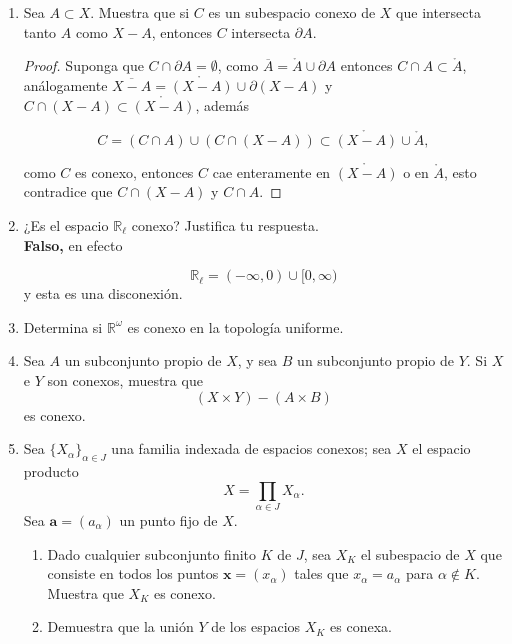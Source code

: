 \documentclass[11pt]{article}
\begin{document}
\begin{enumerate}
    \item Sea $A \subset X$. Muestra que si $C$ es un subespacio conexo de $X$ que intersecta tanto $A$ como $X - A$, entonces $C$ intersecta $\partial A$.

    \begin{proof}
        Suponga que $C\cap \partial A=\emptyset$, como $\overline{A}=\mathring{A}\cup \partial A$ entonces $C\cap A\subset \mathring{A}$, análogamente $\overline{X-A}=\mathring{(X-A)}\cup \partial (X-A)$  y $C\cap (X-A)\subset \mathring{(X-A)}$, además

        $$C=(C\cap A) \cup (C\cap (X-A))\subset \mathring{(X-A)}\cup \mathring{A},$$

        como $C$ es conexo, entonces $C$ cae enteramente en $\mathring{(X-A)}$ o en $\mathring{A}$, esto contradice que $C\cap (X-A)$ y $C\cap A$.
    \end{proof}
    
    \item ¿Es el espacio $\mathbb{R}_\ell$ conexo? Justifica tu respuesta.\\
    
    \textbf{Falso,} en efecto 

    $$\mathbb{R}_{\ell}=(-\infty,0)\cup [0,\infty)$$
     y esta es una disconexión.

    \item Determina si $\mathbb{R}^\omega$ es conexo en la topología uniforme.


    
    \item Sea $A$ un subconjunto propio de $X$, y sea $B$ un subconjunto propio de $Y$. Si $X$ e $Y$ son conexos, muestra que
    \[
    (X \times Y) - (A \times B)
    \]
    es conexo.

    \item Sea $\{X_\alpha\}_{\alpha \in J}$ una familia indexada de espacios conexos; sea $X$ el espacio producto
    \[
    X = \prod_{\alpha \in J} X_\alpha.
    \]
    Sea $\mathbf{a} = (a_\alpha)$ un punto fijo de $X$.
    \begin{enumerate}
        \item Dado cualquier subconjunto finito $K$ de $J$, sea $X_K$ el subespacio de $X$ que consiste en todos los puntos $\mathbf{x} = (x_\alpha)$ tales que $x_\alpha = a_\alpha$ para $\alpha \notin K$. Muestra que $X_K$ es conexo.
        
        \item Demuestra que la unión $Y$ de los espacios $X_K$ es conexa.
        

\end{enumerate}
\end{enumerate}
\end{document}
